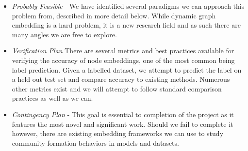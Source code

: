 \documentclass[10pt]{article}
\begin{document}
\begin{itemize}
\begin{itemize}
\item \textit{Probably Feasible} - We have identified several paradigms we can approach this problem from, described in more detail below. While dynamic graph embedding is a hard problem, it is a new research field and as such there are many angles we are free to explore. 
\item \textit{Verification Plan} There are several metrics and best practices available for verifying the accuracy of node embeddings, one of the most common being label prediction. Given a labelled dataset, we attempt to predict the label on a held out test set and compare accuracy to existing methods. Numerous other metrics exist and we will attempt to follow standard comparison practices as well as we can. 
\item \textit{Contingency Plan} - This goal is essential to completion of the project as it features the most novel and significant work. Should we fail to complete it however, there are existing embedding frameworks we can use to study community formation behaviors in models and datasets. 
\end{itemize}
\end{itemize}
\end{document}
